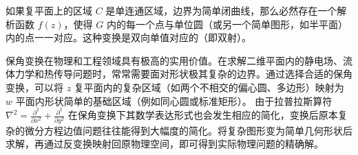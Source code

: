\begin{theorem}[黎曼映射定理]
如果复平面上的区域 \(C\) 是单连通区域，边界为简单闭曲线，那么必然存在一个解析函数 \(f(z)\)，使得 \(G\) 内的每一个点与单位圆（或另一个简单图形，如半平面）内的点一一对应。这种变换是双向单值对应的（即双射）。
\end{theorem}

\begin{remark}[工程应用与物理背景]
保角变换在物理和工程领域具有极高的实用价值。在求解二维平面内的静电场、流体力学和热传导问题时，常常需要面对形状极其复杂的边界。通过选择合适的保角变换，可以将 \(z\) 复平面内的复杂区域（如两个不相交的偏心圆、多边形）映射为 \(w\) 平面内形状简单的基础区域（例如同心圆或标准矩形）。
由于拉普拉斯算符 \(\nabla^2 = \frac{\partial^2}{\partial x^2} + \frac{\partial^2}{\partial y^2}\) 在保角变换下其数学表达形式也会发生相应的简化，变换后原本复杂的微分方程边值问题往往能得到大幅度的简化。将复杂图形变为简单几何形状后求解，再通过反变换映射回原物理空间，即可得到实际物理问题的精确解。
\end{remark}

\bigskip


